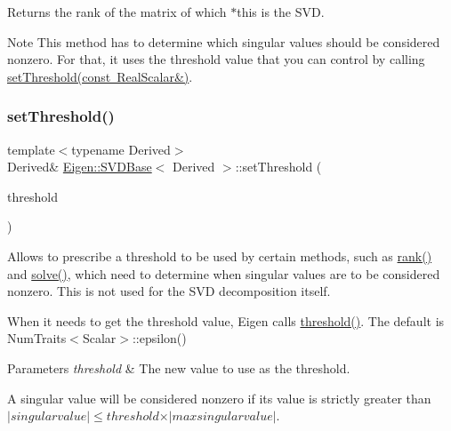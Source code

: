 \begin{DoxyReturn}{Returns}
the rank of the matrix of which {\ttfamily $\ast$this} is the S\+VD.
\end{DoxyReturn}
\begin{DoxyNote}{Note}
This method has to determine which singular values should be considered nonzero. For that, it uses the threshold value that you can control by calling \mbox{\hyperlink{class_eigen_1_1_s_v_d_base_a1c95d05398fc15e410a28560ef70a5a6}{set\+Threshold(const Real\+Scalar\&)}}. 
\end{DoxyNote}
\mbox{\label{class_eigen_1_1_s_v_d_base_a1c95d05398fc15e410a28560ef70a5a6}} 
\subsubsection{\texorpdfstring{setThreshold()}{setThreshold()}\hspace{0.1cm}{\footnotesize\ttfamily [1/2]}}
{\footnotesize\ttfamily template$<$typename Derived$>$ \\
Derived\& \mbox{\hyperlink{class_eigen_1_1_s_v_d_base}{Eigen\+::\+S\+V\+D\+Base}}$<$ Derived $>$\+::set\+Threshold (\begin{DoxyParamCaption}\item[{const Real\+Scalar \&}]{threshold }\end{DoxyParamCaption})\hspace{0.3cm}{\ttfamily [inline]}}

Allows to prescribe a threshold to be used by certain methods, such as \mbox{\hyperlink{class_eigen_1_1_s_v_d_base_a30b89e24f42f1692079eea31b361d26a}{rank()}} and \mbox{\hyperlink{class_eigen_1_1_s_v_d_base_ab28499936c0764fe5b56b9f4de701e26}{solve()}}, which need to determine when singular values are to be considered nonzero. This is not used for the S\+VD decomposition itself.

When it needs to get the threshold value, Eigen calls \mbox{\hyperlink{class_eigen_1_1_s_v_d_base_a98b2ee98690358951807353812a05c69}{threshold()}}. The default is {\ttfamily Num\+Traits$<$\+Scalar$>$\+::epsilon()} 


\begin{DoxyParams}{Parameters}
{\em threshold} & The new value to use as the threshold.\\
\hline
\end{DoxyParams}
A singular value will be considered nonzero if its value is strictly greater than $ \vert singular value \vert \leqslant threshold \times \vert max singular value \vert $.

